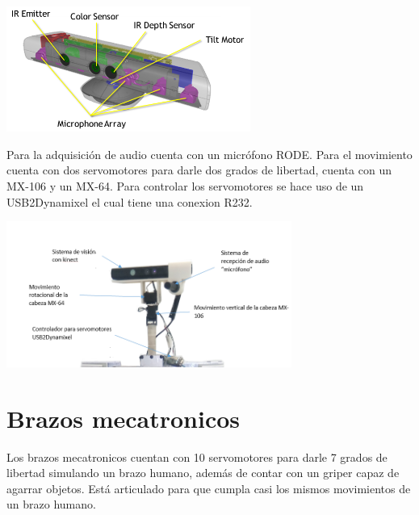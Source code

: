 \documentclass[user_manual.tex]{subfiles}
\begin{document}
\begin{center}
\includegraphics[width=0.6\textwidth]{Figures/Hardware/Partes/Kinect_sensors.png}
\label{fig:Hardware:Diagramas:Justina:Vision:Kinect}
\end{center}

Para la adquisición de audio cuenta con un micrófono RODE. Para el movimiento cuenta con dos servomotores
para darle dos grados de libertad, cuenta con un MX-106 y un MX-64. Para controlar los servomotores se hace uso de un
USB2Dynamixel el cual tiene una conexion R232.

\begin{center}
\includegraphics[width=0.7\textwidth]{Figures/Hardware/Diagramas/Cabeza.png}
\label{fig:Hardware:Diagramas:Justina:Completa}
\end{center}

\newpage
\section{Brazos mecatronicos}
Los brazos mecatronicos cuentan con 10 servomotores para darle 7 grados de libertad simulando un brazo humano, además de contar con un griper capaz de agarrar objetos.
Está articulado para que cumpla casi los mismos movimientos de un brazo humano.
\end{document}

